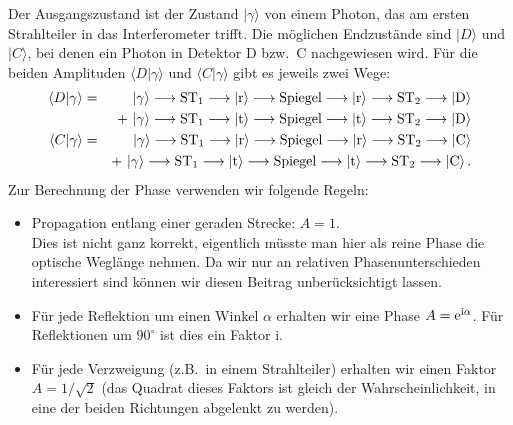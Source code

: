 Der Ausgangszustand ist der Zustand $|\gamma \rangle$ von einem Photon, das am
ersten Strahlteiler in das Interferometer trifft. Die m\"oglichen Endzust\"ande sind $|D\rangle$ und $|C\rangle$,
bei denen ein Photon in Detektor D bzw.\ C nachgewiesen wird. F\"ur die beiden
Amplituden $\langle D | \gamma \rangle$ und $\langle C | \gamma \rangle$
gibt es jeweils zwei Wege:
\begin{eqnarray}
\nonumber
     \langle D | \gamma \rangle &=&  |\gamma \rangle \longrightarrow \mbox{ST}_1 \longrightarrow
       | {\rm r} \rangle \longrightarrow \mbox{Spiegel} \longrightarrow |{\rm r}\rangle \longrightarrow 
       \mbox{ST}_2 \longrightarrow |{\rm D}\rangle  \\
     & &  + ~ |\gamma \rangle \longrightarrow \mbox{ST}_1 \longrightarrow
       | {\rm t} \rangle \longrightarrow \mbox{Spiegel} \longrightarrow |{\rm t}\rangle \longrightarrow 
       \mbox{ST}_2 \longrightarrow |{\rm D}\rangle  \\
 \nonumber      
     \langle C | \gamma \rangle &=&  |\gamma \rangle \longrightarrow \mbox{ST}_1 \longrightarrow
       | {\rm r} \rangle \longrightarrow \mbox{Spiegel} \longrightarrow |{\rm r}\rangle \longrightarrow 
       \mbox{ST}_2 \longrightarrow |{\rm C}\rangle  \\
     & &  + ~  |\gamma \rangle \longrightarrow \mbox{ST}_1 \longrightarrow
       | {\rm t} \rangle \longrightarrow \mbox{Spiegel} \longrightarrow |{\rm t}\rangle \longrightarrow 
       \mbox{ST}_2 \longrightarrow |{\rm C}\rangle  \, .  
\end{eqnarray}
Zur Berechnung der Phase verwenden wir folgende Regeln:
\begin{itemize}
\item
Propagation entlang einer geraden Strecke: $A = 1$.\\
Dies ist nicht ganz korrekt, eigentlich m\"usste man hier als reine Phase die optische Wegl\"ange
nehmen. Da wir nur an relativen Phasenunterschieden interessiert sind k\"onnen wir diesen Beitrag unber\"ucksichtigt lassen.
\item
F\"ur jede Reflektion um einen Winkel $\alpha$ erhalten wir eine Phase $A={\rm e}^{{\rm i}\alpha}$. 
F\"ur Reflektionen um $90^\circ$ ist dies ein Faktor i.
\item
F\"ur jede Verzweigung (z.B.\ in einem Strahlteiler) erhalten wir einen Faktor $A=1/\sqrt{2}$ (das Quadrat
dieses Faktors ist gleich der Wahrscheinlichkeit, in eine der beiden Richtungen abgelenkt zu werden).
\end{itemize}
